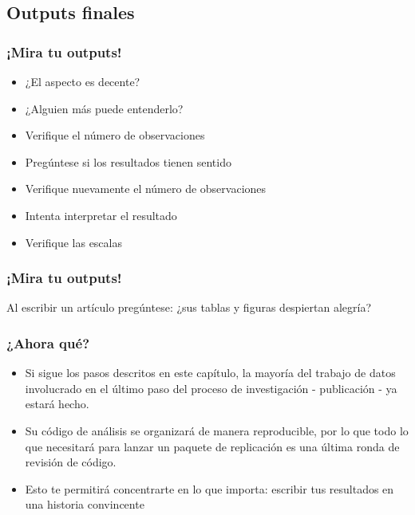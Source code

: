 \documentclass[10pt, aspectratio=169, compress]{beamer}
\makeatletter
\def\beamer@writeslidentry@miniframesoff{%
	\expandafter\beamer@ifempty\expandafter{\beamer@framestartpage}{}%
	{%
		\clearpage\beamer@notesactions%
	}
}
\newcommand*{\miniframesoff}{\let\beamer@writeslidentry=\beamer@writeslidentry@miniframesoff}
\makeatother
\begin{document}
\subsection{Outputs finales}
\begin{frame}
	\frametitle{¡Mira tu outputs!}
	\begin{itemize}
		\item ¿El aspecto es decente?
		\item ¿Alguien más puede entenderlo?
		\item Verifique el número de observaciones
		\item Pregúntese si los resultados tienen sentido
		\item Verifique nuevamente el número de observaciones
		\item Intenta interpretar el resultado
		\item Verifique las escalas
	\end{itemize}
\end{frame}
\begin{frame}
	\frametitle{¡Mira tu outputs!}

	\begin{center}
		{
		\LARGE
			Al escribir un artículo pregúntese: ¿sus tablas y figuras despiertan alegría?
		}
	\end{center}
\end{frame}
\begin{frame}
	\frametitle{¿Ahora qué?}

	\begin{itemize}[<+->]
		\item Si sigue los pasos descritos en este capítulo, la mayoría del trabajo de datos involucrado en el último paso del proceso de investigación - publicación - ya estará hecho.
		\item Su código de análisis se organizará de manera reproducible, por lo que todo lo que necesitará para lanzar un paquete de replicación es una última ronda de revisión de código.
		\item Esto te permitirá concentrarte en lo que importa: escribir tus resultados en una historia convincente
	\end{itemize}
\end{frame}

\miniframesoff 	
\end{document}
